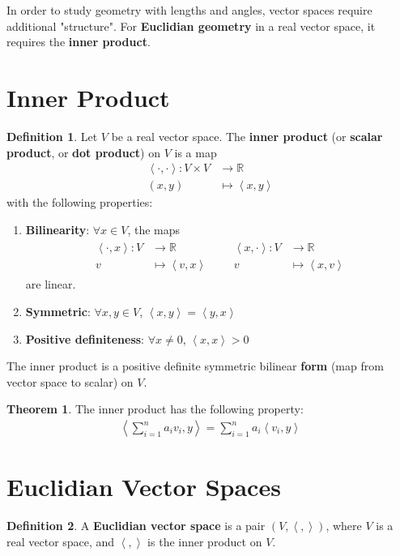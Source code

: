 \documentclass[letterpaper,12pt]{article}
\theoremstyle{definition}
\newtheorem*{definition}{Definition}
\newtheorem*{theorem}{Theorem}
\newcommand{\inp}[2]{\left< #1, #2 \right>}
\begin{document}
In order to study geometry with lengths and angles, vector spaces require additional "structure". For \textbf{Euclidian geometry} in a real vector space, it requires the \textbf{inner product}.

\section*{Inner Product}
\begin{definition}
Let $V$ be a real vector space. The \textbf{inner product} (or \textbf{scalar product}, or \textbf{dot product}) on $V$ is a map
\begin{align*}
    \inp{\cdot}{\cdot} : V \times V & \longrightarrow \mathbb{R} \\
    (x,y) & \longmapsto \inp{x}{y}
\end{align*}
with the following properties:
\begin{enumerate}
    \item \textbf{Bilinearity}: $\forall x \in V$, the maps
    \begin{align*}
    \begin{aligned}
        \inp{\cdot}{x} : V & \longrightarrow \mathbb{R} \\
        v & \longmapsto \inp{v}{x}
    \end{aligned} &&
    \begin{aligned}
        \inp{x}{\cdot} : V & \longrightarrow \mathbb{R} \\
        v & \longmapsto \inp{x}{v}
    \end{aligned}
    \end{align*}
    are linear.
    \item \textbf{Symmetric}: $\forall x, y \in V$, $\inp{x}{y} = \inp{y}{x}$
    \item \textbf{Positive definiteness}: $\forall x \neq 0$, $\inp{x}{x} > 0$
\end{enumerate}
The inner product is a positive definite symmetric bilinear \textbf{form} (map from vector space to scalar) on $V$.
\end{definition}

\begin{theorem}
The inner product has the following property:
\begin{align*}
    \inp{\sum_{i=1}^n a_i v_i}{y} = \sum_{i=1}^n a_i \inp{v_i}{y}
\end{align*}
\end{theorem}

\section*{Euclidian Vector Spaces}
\begin{definition}
A \textbf{Euclidian vector space} is a pair $(V, \inp{}{})$, where $V$ is a real vector space, and $\inp{}{}$ is the inner product on $V$.
\end{definition}
\end{document}
